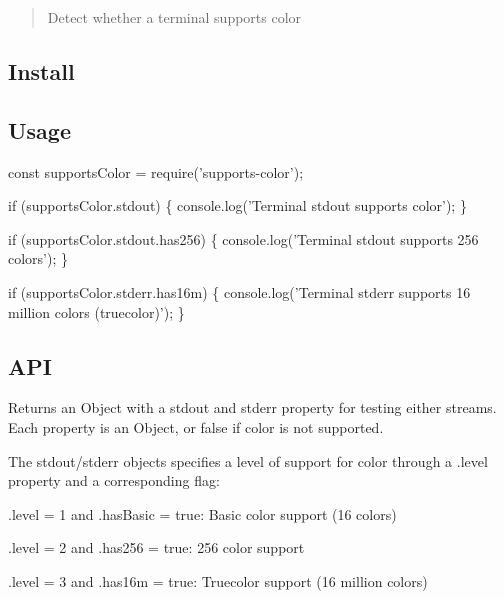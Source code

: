 \begin{quote}
Detect whether a terminal supports color \end{quote}


\subsection*{Install}




\subsection*{Usage}


\begin{DoxyCode}
const supportsColor = require('supports-color');

if (supportsColor.stdout) \{
  console.log('Terminal stdout supports color');
\}

if (supportsColor.stdout.has256) \{
  console.log('Terminal stdout supports 256 colors');
\}

if (supportsColor.stderr.has16m) \{
  console.log('Terminal stderr supports 16 million colors (truecolor)');
\}
\end{DoxyCode}


\subsection*{A\+PI}

Returns an {\ttfamily Object} with a {\ttfamily stdout} and {\ttfamily stderr} property for testing either streams. Each property is an {\ttfamily Object}, or {\ttfamily false} if color is not supported.

The {\ttfamily stdout}/{\ttfamily stderr} objects specifies a level of support for color through a {\ttfamily .level} property and a corresponding flag\+:


\begin{DoxyItemize}
\item {\ttfamily .level = 1} and {\ttfamily .has\+Basic = true}\+: Basic color support (16 colors)
\item {\ttfamily .level = 2} and {\ttfamily .has256 = true}\+: 256 color support
\item {\ttfamily .level = 3} and {\ttfamily .has16m = true}\+: Truecolor support (16 million colors)
\end{DoxyItemize}

